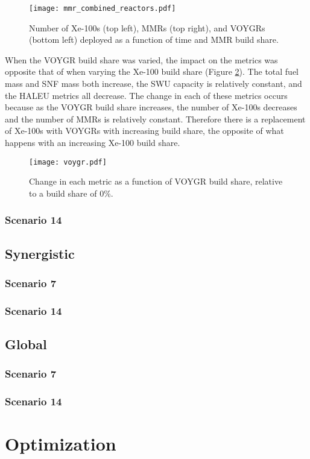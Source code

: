 \begin{figure}
    \centering
    \texttt{[image: mmr\_combined\_reactors.pdf]}
    \caption{Number of Xe-100s (top left), MMRs (top right), and 
    VOYGRs (bottom left) deployed as a function of time and 
    MMR build share.}
    \label{fig:mmr_reactors_s7}
\end{figure}

When the VOYGR build share was varied, the impact on the metrics was 
opposite that of when varying the Xe-100 build share (Figure 
\ref{fig:voygr_scenario7}). The total fuel mass and \gls{SNF} mass both 
increase, the \gls{SWU} capacity is relatively constant, and the 
\gls{HALEU} metrics all decrease. The change in each of these metrics 
occurs because as the VOYGR build share increases, the number of Xe-100s 
decreases and the number of \glspl{MMR} is relatively constant. Therefore 
there is a replacement of Xe-100s with VOYGRs with increasing build share, 
the opposite of what happens with an increasing Xe-100 build share. 

\begin{figure}
    \centering
    \texttt{[image: voygr.pdf]}
    \caption{Change in each metric as a function of VOYGR build share, 
    relative to a build share of 0\%.}
    \label{fig:voygr_scenario7}
\end{figure}

\subsubsection{Scenario 14}

\subsection{Synergistic}
\subsubsection{Scenario 7}

\subsubsection{Scenario 14}

\subsection{Global}
\subsubsection{Scenario 7}

\subsubsection{Scenario 14}

\section{Optimization}